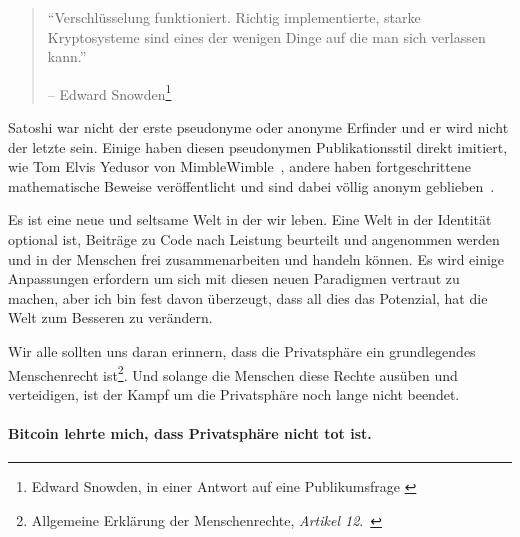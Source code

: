 \begin{quotation}\begin{samepage}
\enquote{Verschlüsselung funktioniert. Richtig implementierte, starke
Kryptosysteme sind eines der wenigen Dinge auf die man sich verlassen kann.}
\begin{flushright} -- Edward Snowden\footnote{Edward Snowden, in einer Antwort
auf eine Publikumsfrage \cite{snowden}}
\end{flushright}\end{samepage}\end{quotation}

Satoshi war nicht der erste pseudonyme oder anonyme Erfinder und er wird nicht
der letzte sein. Einige haben diesen pseudonymen Publikationsstil direkt
imitiert, wie Tom Elvis Yedusor von MimbleWimble~\cite{mimblewimble-origin},
andere haben fortgeschrittene mathematische Beweise veröffentlicht und sind
dabei völlig anonym geblieben~\cite{4chan-math}.

Es ist eine neue und seltsame Welt in der wir leben. Eine Welt in der Identität
optional ist, Beiträge zu Code nach Leistung beurteilt und angenommen werden und
in der Menschen frei zusammenarbeiten und handeln können. Es wird einige
Anpassungen erfordern um sich mit diesen neuen Paradigmen vertraut zu machen,
aber ich bin fest davon überzeugt, dass all dies das Potenzial, hat die Welt zum
Besseren zu verändern.

Wir alle sollten uns daran erinnern, dass die Privatsphäre ein grundlegendes
Menschenrecht ist\footnote{Allgemeine Erklärung der Menschenrechte,
\textit{Artikel 12}.~\cite{article12}}. Und solange die Menschen diese Rechte
ausüben und verteidigen, ist der Kampf um die Privatsphäre noch lange nicht
beendet.

\paragraph{Bitcoin lehrte mich, dass Privatsphäre nicht tot ist.}

%
%
%
%
